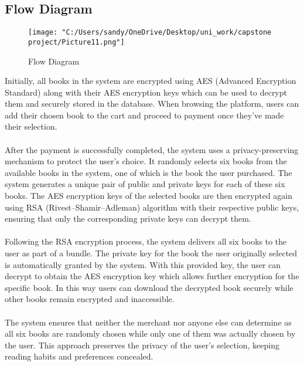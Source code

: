 \documentclass[12pt]{article}
\begin{document}
\subsection{Flow Diagram}
\begin{figure}[H]
	\centering
	\texttt{[image: "C:/Users/sandy/OneDrive/Desktop/uni\_work/capstone project/Picture11.png"]}
	\caption{Flow Diagram}
	
\end{figure}
Initially, all books in the system are encrypted using AES (Advanced Encryption Standard) along with their AES encryption keys which can be used to decrypt them and securely stored in the database. When browsing the platform, users can add their chosen book to the cart and proceed to payment once they've made their selection.\\\\
After the payment is successfully completed, the system uses a privacy-preserving mechanism to protect the user's choice. It randomly selects six books from the available books in the system, one of which is the book the user purchased. The system generates a unique pair of public and private keys for each of these six books. The AES encryption keys of the selected books are then encrypted again using RSA (Rivest–Shamir–Adleman) algorithm with their respective public keys, ensuring that only the corresponding private keys can decrypt them.\\\\
Following the RSA encryption process, the system delivers all six books to the user as part of a bundle. The private key for the book the user originally selected is automatically granted by the system. With this provided key, the user can decrypt to obtain the AES encryption key which allows further encryption for the specific book. In this way users can download the decrypted book securely while other books remain encrypted and inaccessible.\\\\
The system ensures that neither the merchant nor anyone else can determine as all six books are randomly chosen while only one of them was actually chosen by the user. This approach preserves the privacy of the user's selection, keeping reading habits and preferences concealed.
\pagebreak
\end{document}
